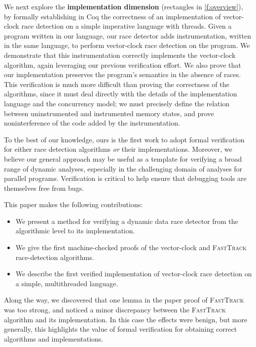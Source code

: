 \documentclass[preprint, 9pt]{sigplanconf}
\newcommand{\FT}{\textsc{FastTrack}\xspace}
\begin{document}
We next explore the \textbf{implementation dimension} (rectangles in \autoref{f:overview}), by formally establishing in Coq the correctness of an implementation of vector-clock race detection on a simple imperative language with threads. Given a program written in our language, our race detector adds instrumentation, written in the same language, to perform vector-clock race detection on the program. We demonstrate that this instrumentation correctly implements the vector-clock algorithm, again leveraging our previous verification effort. We also prove that our implementation preserves the program's semantics in the absence of races. This verification is much more difficult than proving the correctness of the algorithms, since it must deal directly with the details of the implementation language and the concurrency model; we must precisely define the relation between uninstrumented and instrumented memory states, and prove noninterference of the code added by the instrumentation.

To the best of our knowledge, ours is the first work to adopt formal verification for either race detection algorithms \emph{or} their implementations. Moreover, we believe our general approach may be useful as a template for verifying a broad range of dynamic analyses, especially in the challenging domain of analyses for parallel programs. Verification is critical to help ensure that debugging tools are themselves free from bugs.

This paper makes the following contributions:
\begin{itemize}
\item We present a method for verifying a dynamic data race detector from the algorithmic level to its implementation.
\item We give the first machine-checked proofs of the vector-clock and \FT race-detection algorithms.
\item We describe the first verified implementation of vector-clock race detection on a simple, multithreaded language.

\end{itemize}
Along the way, we discovered that one lemma in the paper proof of \FT was too strong, and noticed a minor discrepancy between the \FT algorithm and its implementation. In this case the effects were benign, but more generally, this highlights the value of formal verification for obtaining correct algorithms and implementations.
\end{document}
